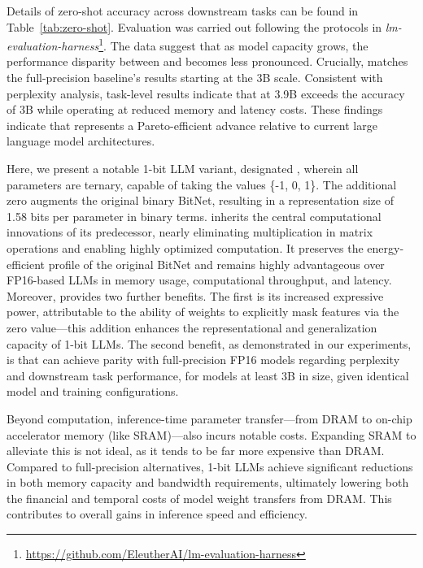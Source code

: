 Details of zero-shot accuracy across downstream tasks can be found in Table~\ref{tab:zero-shot}. Evaluation was carried out following the protocols in \emph{lm-evaluation-harness}\footnote{\url{https://github.com/EleutherAI/lm-evaluation-harness}}. The data suggest that as model capacity grows, the performance disparity between  and  becomes less pronounced. Crucially,  matches the full-precision baseline’s results starting at the 3B scale. Consistent with perplexity analysis, task-level results indicate that  at 3.9B exceeds the accuracy of  3B while operating at reduced memory and latency costs. These findings indicate that  represents a Pareto-efficient advance relative to current large language model architectures.

Here, we present a notable 1-bit LLM variant, designated \textbf{}, wherein all parameters are ternary, capable of taking the values \{-1, 0, 1\}. The additional zero augments the original binary BitNet, resulting in a representation size of 1.58 bits per parameter in binary terms.  inherits the central computational innovations of its predecessor, nearly eliminating multiplication in matrix operations and enabling highly optimized computation. It preserves the energy-efficient profile of the original BitNet and remains highly advantageous over FP16-based LLMs in memory usage, computational throughput, and latency. Moreover,  provides two further benefits. The first is its increased expressive power, attributable to the ability of weights to explicitly mask features via the zero value—this addition enhances the representational and generalization capacity of 1-bit LLMs. The second benefit, as demonstrated in our experiments, is that  can achieve parity with full-precision FP16 models regarding perplexity and downstream task performance, for models at least 3B in size, given identical model and training configurations.

Beyond computation, inference-time parameter transfer—from DRAM to on-chip accelerator memory (like SRAM)—also incurs notable costs. Expanding SRAM to alleviate this is not ideal, as it tends to be far more expensive than DRAM. Compared to full-precision alternatives, 1-bit LLMs achieve significant reductions in both memory capacity and bandwidth requirements, ultimately lowering both the financial and temporal costs of model weight transfers from DRAM. This contributes to overall gains in inference speed and efficiency.

